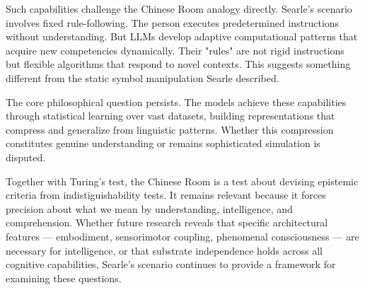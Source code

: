 Such capabilities challenge the Chinese Room analogy directly. Searle's scenario involves fixed rule-following. The person executes predetermined instructions without understanding. But LLMs develop adaptive computational patterns that acquire new competencies dynamically. Their "rules" are not rigid instructions but flexible algorithms that respond to novel contexts. This suggests something different from the static symbol manipulation Searle described.

The core philosophical question persists. The models achieve these capabilities through statistical learning over vast datasets, building representations that compress and generalize from linguistic patterns. Whether this compression constitutes genuine understanding or remains sophisticated simulation is disputed.

Together with Turing's test, the Chinese Room is a test about devising epistemic criteria from indistiguishability tests. It remains relevant because it forces precision about what we mean by understanding, intelligence, and comprehension. Whether future research reveals that specific architectural features — embodiment, sensorimotor coupling, phenomenal consciousness — are necessary for intelligence, or that substrate independence holds across all cognitive capabilities, Searle's scenario continues to provide a framework for examining these questions.

\clearpage

